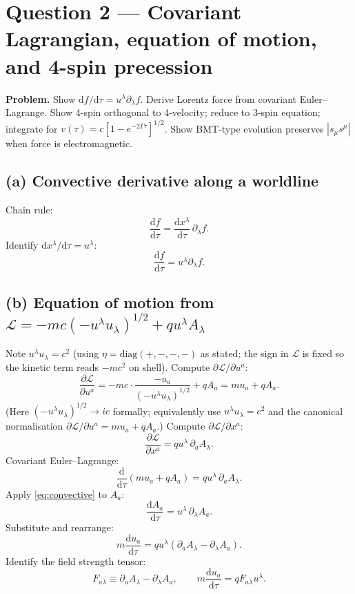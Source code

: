 \documentclass[11pt]{article}
\newcommand{\de}{\mathrm{d}}
\newcommand{\pd}[2]{\frac{\partial #1}{\partial #2}}
\begin{document}
\section*{Question 2 --- Covariant Lagrangian, equation of motion, and 4-spin precession}

\textbf{Problem.} Show $\de f/\de\tau=u^\lambda\partial_\lambda f$. Derive Lorentz force from covariant Euler--Lagrange. Show 4-spin orthogonal to 4-velocity; reduce to 3-spin equation; integrate for $v(\tau)=c[1-e^{-2\Gamma\tau}]^{1/2}$. Show BMT-type evolution preserves $|s_\mu s^\mu|$ when force is electromagnetic.

\subsection*{(a) Convective derivative along a worldline}

Chain rule:
\[ \frac{\de f}{\de\tau} = \frac{\de x^\lambda}{\de\tau}\,\partial_\lambda f. \]
Identify $\de x^\lambda/\de\tau=u^\lambda$:
\begin{equation}
\boxed{\;\frac{\de f}{\de\tau} = u^\lambda\partial_\lambda f.\;}
\label{eq:convective}
\end{equation}

\subsection*{(b) Equation of motion from $\mathcal{L}=-mc(-u^\lambda u_\lambda)^{1/2}+qu^\lambda A_\lambda$}

Note $u^\lambda u_\lambda=c^2$ (using $\eta=\mathrm{diag}(+,-,-,-)$ as stated; the sign in $\mathcal{L}$ is fixed so the kinetic term reads $-mc^2$ on shell). Compute $\partial\mathcal{L}/\partial u^a$:
\[ \pd{\mathcal{L}}{u^a} = -mc\cdot\frac{-u_a}{(-u^\lambda u_\lambda)^{1/2}} + qA_a = m u_a + qA_a. \]
(Here $(-u^\lambda u_\lambda)^{1/2}\to ic$ formally; equivalently use $u^\lambda u_\lambda=c^2$ and the canonical normalisation $\partial\mathcal{L}/\partial u^a=mu_a+qA_a$.)
Compute $\partial\mathcal{L}/\partial x^a$:
\[ \pd{\mathcal{L}}{x^a} = q u^\lambda\,\partial_a A_\lambda. \]
Covariant Euler--Lagrange:
\[ \frac{\de}{\de\tau}(mu_a + qA_a) = q u^\lambda\,\partial_a A_\lambda. \]
Apply \eqref{eq:convective} to $A_a$:
\[ \frac{\de A_a}{\de\tau} = u^\lambda\,\partial_\lambda A_a. \]
Substitute and rearrange:
\[ m\frac{\de u_a}{\de\tau} = q u^\lambda(\partial_a A_\lambda - \partial_\lambda A_a). \]
Identify the field strength tensor:
\begin{equation}
\boxed{\;F_{a\lambda} \equiv \partial_a A_\lambda - \partial_\lambda A_a,\qquad m\frac{\de u_a}{\de\tau} = qF_{a\lambda}u^\lambda.\;}
\label{eq:lorentz}
\end{equation}
\end{document}
